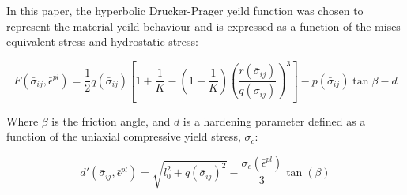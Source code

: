 





In this paper, the hyperbolic Drucker-Prager yeild function was chosen to represent the material yeild behaviour and is expressed as a function of the mises equivalent stress and hydrostatic stress:

\begin{equation}
F\left(\bar{\sigma}_{ij}, \bar{\epsilon}^{pl}\right)=\frac{1}{2}q\left(\bar{\sigma}_{ij}\right)\left [ 1+\frac{1}{K}-\left ( 1-\frac{1}{K} \right )\left ( \frac{r\left(\bar{\sigma}_{ij}\right)}{q\left(\bar{\sigma}_{ij}\right)} \right )^3 \right ]-p\left(\bar{\sigma}_{ij}\right)\tan\beta-d\label{eqn:druc2}
\end{equation}

Where $\beta$ is the friction angle, and $d$ is a hardening parameter defined as a function of the uniaxial compressive yield stress, $\sigma_c$:

\begin{equation}
d'\left(\bar{\sigma}_{ij}, \bar{\epsilon}^{pl}\right)=\sqrt{l_{0}^{2}+q\left(\bar{\sigma}_{ij}\right)^{2}}-\frac{\sigma_c\left(\bar{\epsilon}^{pl}\right)}{3}\tan\left(\beta\right)
\label{eqn:druc2-2}
\end{equation}


